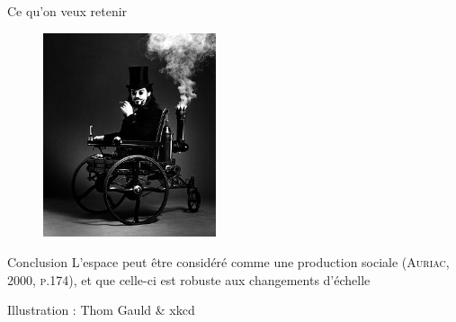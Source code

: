 \documentclass[newPxFont]{beamer}
\begin{document}
\begin{frame}[c]{Ce qu'on veux retenir}
  \vspace{-2em}

  \begin{figure}
   \includegraphics[height=6cm]{img/a_www.jpg}
  \end{figure}
\end{frame}
\begin{frame}[c]{Conclusion}
\vspace{-2em}
L'espace peut être considéré comme une production sociale (\textsc{Auriac, 2000, p.174}), et que celle-ci est robuste aux changements d'échelle
\end{frame}

{
%
\begin{frame}
  \begin{minipage}[t][.8\textheight]{\textwidth}

    \vfill

    \hfill {}

    \hfill \small{Illustration : Thom Gauld \& xkcd}
  \end{minipage}

\end{frame}
}

\end{document}
